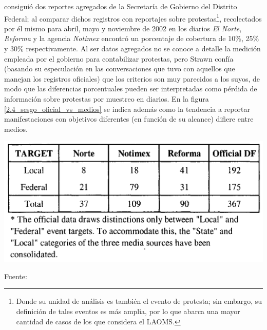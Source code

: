 \documentclass[letterpaper, 11pt]{book}
\theoremstyle{definition}
\theoremstyle{remark}
\begin{document}
\citet{2005_Strawn_Tesis} consiguió dos reportes agregados de la Secretaría de Gobierno del Distrito Federal; al comparar dichos registros con reportajes sobre protestas\footnote{Donde su unidad de análisis es también el evento de protesta; sin embargo, su definición de tales eventos es más amplia, por lo que abarca una mayor cantidad de casos de los que considera el LAOMS.}, recolectados por él mismo para abril, mayo y noviembre de 2002 en los diarios \emph{El Norte}, \emph{Reforma} y la agencia \emph{Notimex} encontró un porcentaje de cobertura de 10\%, 25\% y 30\% respectivamente. 
Al ser datos agregados no se conoce a detalle la medición empleada por el gobierno para contabilizar protestas, pero Strawn confía (basando su especulación en las conversaciones que tuvo con aquellos que manejan los registros oficiales) que los criterios son muy parecidos a los suyos, de modo que las diferencias porcentuales pueden ser interpretadas como pérdida de información sobre protestas por muestreo en diarios. 
En la figura \ref{2.4_sesgo_oficial_vs_medios} se indica además como la tendencia a reportar manifestaciones con objetivos diferentes (en función de su alcance) difiere entre medios.

\begin{minipage}{\linewidth}
\centering
{} \label{2.4_sesgo_oficial_vs_medios}
\includegraphics[scale=0.18]{img/2.4_sesgo_oficial_vs_medios.png}
\par\bigskip
\small Fuente: \citep[163]{2005_Strawn_Tesis}
\end{minipage}\bigskip
\end{document}
